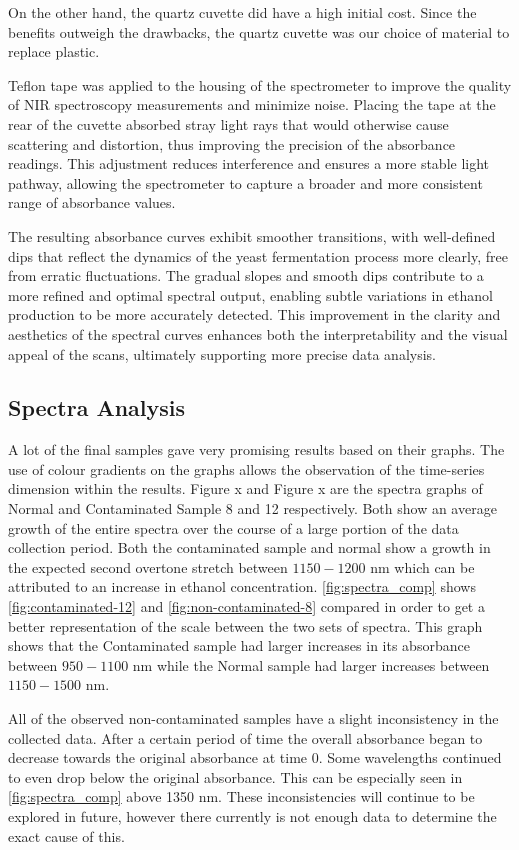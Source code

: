 \documentclass[12pt]{report}
\begin{document}
On the other hand, the quartz cuvette did have a high initial cost. Since the benefits outweigh the drawbacks, the quartz cuvette was our choice of material to replace plastic.

Teflon tape was applied to the housing of the spectrometer to improve the quality of NIR spectroscopy measurements and minimize noise. Placing the tape at the rear of the cuvette absorbed stray light rays that would otherwise cause scattering and distortion, thus improving the precision of the absorbance readings. This adjustment reduces interference and ensures a more stable light pathway, allowing the spectrometer to capture a broader and more consistent range of absorbance values.

The resulting absorbance curves exhibit smoother transitions, with well-defined dips that reflect the dynamics of the yeast fermentation process more clearly, free from erratic fluctuations. The gradual slopes and smooth dips contribute to a more refined and optimal spectral output, enabling subtle variations in ethanol production to be more accurately detected. This improvement in the clarity and aesthetics of the spectral curves enhances both the interpretability and the visual appeal of the scans, ultimately supporting more precise data analysis.

\subsection{Spectra Analysis}

A lot of the final samples gave very promising results based on their graphs. The use of colour gradients on the graphs allows the observation of the time-series dimension within the results. Figure x and Figure x are the spectra graphs of Normal and Contaminated Sample 8 and 12 respectively. Both show an average growth of the entire spectra over the course of a large portion of the data collection period. Both the contaminated sample and normal show a growth in the expected second overtone  stretch between $1150-1200$ nm which can be attributed to an increase in ethanol concentration. \autoref{fig:spectra_comp} shows \autoref{fig:contaminated-12} and \autoref{fig:non-contaminated-8} compared in order to get a better representation of the scale between the two sets of spectra. This graph shows that the Contaminated sample had larger increases in its absorbance between $950-1100$ nm while the Normal sample had larger increases between $1150-1500$ nm. 

All of the observed non-contaminated samples have a slight inconsistency in the collected data. After a certain period of time the overall absorbance began to decrease towards the original absorbance at time 0. Some wavelengths continued to even drop below the original absorbance. This can be especially seen in \autoref{fig:spectra_comp} above 1350 nm. These inconsistencies will continue to be explored in future, however there currently is not enough data to determine the exact cause of this.
\end{document}

